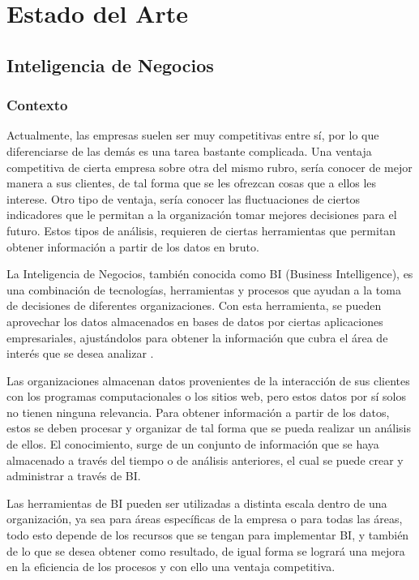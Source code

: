 \documentclass[letter,12pt,oneside]{report}
\begin{document}
\newpage
\chapter{Estado del Arte}

\section{Inteligencia de Negocios}
\subsection{Contexto}
Actualmente, las empresas suelen ser muy competitivas entre sí, por lo que diferenciarse de las demás es una tarea bastante complicada. Una ventaja competitiva de cierta empresa sobre otra del mismo rubro, sería conocer de mejor manera a sus clientes, de tal forma que se les ofrezcan cosas que a ellos les interese. Otro tipo de ventaja, sería conocer las fluctuaciones de ciertos indicadores que le permitan a la organización tomar mejores decisiones para el futuro. Estos tipos de análisis, requieren de ciertas herramientas que permitan obtener información a partir de los datos en bruto.

La Inteligencia de Negocios, también conocida como BI (Business Intelligence), es una combinación de tecnologías, herramientas y procesos que ayudan a la toma de decisiones de diferentes organizaciones. Con esta herramienta, se pueden aprovechar los datos almacenados en bases de datos por ciertas aplicaciones empresariales, ajustándolos para obtener la información que cubra el área de interés que se desea analizar \cite{P2}.

Las organizaciones almacenan datos provenientes de la interacción de sus clientes con los programas computacionales o los sitios web, pero estos datos por sí solos no tienen ninguna relevancia. Para obtener información a partir de los datos, estos se deben procesar y organizar de tal forma que se pueda realizar un análisis de ellos. El conocimiento, surge de un conjunto de información que se haya almacenado a través del tiempo o de análisis anteriores, el cual se puede crear y administrar a través de BI.

Las herramientas de BI pueden ser utilizadas a distinta escala dentro de una organización, ya sea para áreas específicas de la empresa o para todas las áreas, todo esto depende de los recursos que se tengan para implementar BI, y también de lo que se desea obtener como resultado, de igual forma se logrará una mejora en la eficiencia de los procesos y con ello una ventaja competitiva. 
\end{document}
